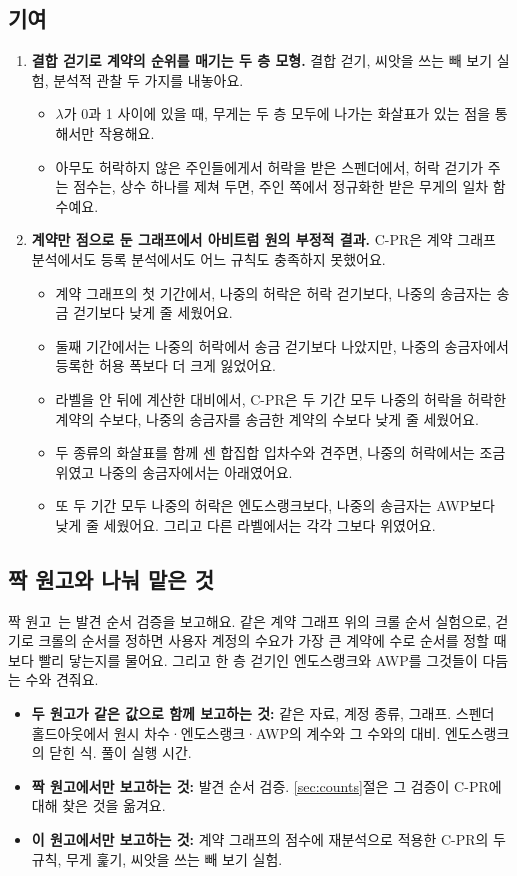 \subsection{기여}

\begin{enumerate}
\item \textbf{결합 걷기로 계약의 순위를 매기는 두 층 모형.} 결합 걷기, 씨앗을 쓰는 빼 보기 실험, 분석적 관찰 두 가지를 내놓아요.
  \begin{itemize}
  \item $\lambda$가 0과 1 사이에 있을 때, 무게는 두 층 모두에 나가는 화살표가 있는 점을 통해서만 작용해요.
  \item 아무도 허락하지 않은 주인들에게서 허락을 받은 스펜더에서, 허락 걷기가 주는 점수는, 상수 하나를 제쳐 두면, 주인 쪽에서 정규화한 받은 무게의 일차 함수예요.
  \end{itemize}
\item \textbf{계약만 점으로 둔 그래프에서 아비트럼 원의 부정적 결과.} C-PR은 계약 그래프 분석에서도 등록 분석에서도 어느 규칙도 충족하지 못했어요.
  \begin{itemize}
  \item 계약 그래프의 첫 기간에서, 나중의 허락은 허락 걷기보다, 나중의 송금자는 송금 걷기보다 낮게 줄 세웠어요.
  \item 둘째 기간에서는 나중의 허락에서 송금 걷기보다 나았지만, 나중의 송금자에서 등록한 허용 폭보다 더 크게 잃었어요.
  \item 라벨을 안 뒤에 계산한 대비에서, C-PR은 두 기간 모두 나중의 허락을 허락한 계약의 수보다, 나중의 송금자를 송금한 계약의 수보다 낮게 줄 세웠어요.
  \item 두 종류의 화살표를 함께 센 합집합 입차수와 견주면, 나중의 허락에서는 조금 위였고 나중의 송금자에서는 아래였어요.
  \item 또 두 기간 모두 나중의 허락은 엔도스랭크보다, 나중의 송금자는 AWP보다 낮게 줄 세웠어요. 그리고 다른 라벨에서는 각각 그보다 위였어요.
  \end{itemize}
\end{enumerate}

\subsection{짝 원고와 나눠 맡은 것}

짝 원고~\cite{kwon2026companion}는 발견 순서 검증을 보고해요. 같은 계약 그래프 위의 크롤 순서 실험으로, 걷기로 크롤의 순서를 정하면 사용자 계정의 수요가 가장 큰 계약에 수로 순서를 정할 때보다 빨리 닿는지를 물어요. 그리고 한 층 걷기인 엔도스랭크와 AWP를 그것들이 다듬는 수와 견줘요.
\begin{itemize}
\item \textbf{두 원고가 같은 값으로 함께 보고하는 것:} 같은 자료, 계정 종류, 그래프. 스펜더 홀드아웃에서 원시 차수·엔도스랭크·AWP의 계수와 그 수와의 대비. 엔도스랭크의 닫힌 식. 풀이 실행 시간.
\item \textbf{짝 원고에서만 보고하는 것:} 발견 순서 검증. \ref{sec:counts}절은 그 검증이 C-PR에 대해 찾은 것을 옮겨요.
\item \textbf{이 원고에서만 보고하는 것:} 계약 그래프의 점수에 재분석으로 적용한 C-PR의 두 규칙, 무게 훑기, 씨앗을 쓰는 빼 보기 실험.
\end{itemize}

